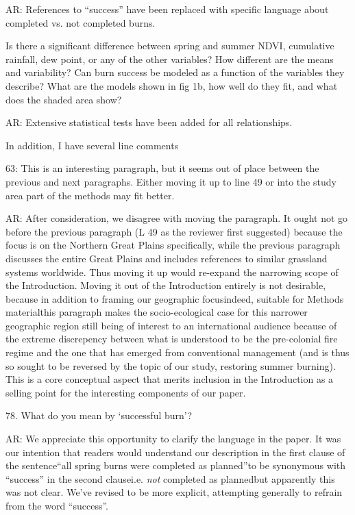 \documentclass[parskip=half, american]{scrartcl}
\newcommand{\AR}[1]
	{\color{PineGreen}AR: #1\color{black} \par }
\begin{document}
\AR{References to ``success'' have been replaced with specific language about completed vs. not completed burns. }

Is there a significant difference between spring and summer NDVI, cumulative rainfall, dew point, or any of the other variables? How different are the means and variability?  Can burn success be modeled as a function of the variables they describe?  What are the models shown in fig 1b, how well do they fit, and what does the shaded area show?

\AR{Extensive statistical tests have been added for all relationships. }

In addition, I have several line comments

63:  This is an interesting paragraph, but it seems out of place between the previous and next paragraphs.  Either moving it up to line 49 or into the study area part of the methods may fit better.

\AR{After consideration, we disagree with moving the paragraph. 
 	It ought not go before the previous paragraph (L 49 as the reviewer first suggested) because the focus is on the Northern Great Plains specifically, while the previous paragraph discusses the entire Great Plains and includes references to similar grassland systems worldwide. 
Thus moving it up would re-expand the narrowing scope of the Introduction. 
Moving it out of the Introduction entirely is not desirable, because in addition to framing our geographic focus\textemdash indeed, suitable for Methods material\textemdash this paragraph makes the socio-ecological case for this narrower geographic region still being of interest to an international audience because of the extreme discrepency between what is understood to be the pre-colonial fire regime and the one that has emerged from conventional management (and is thus so sought to be reversed by the topic of our study, restoring summer burning). 
This is a core conceptual aspect that merits inclusion in the Introduction as a selling point for the interesting components of our paper.  }

78.  What do you mean by `successful burn'?  

\AR{We appreciate this opportunity to clarify the language in the paper. 
It was our intention that readers would understand our description in the first clause of the sentence\textemdash ``all spring burns were completed as planned''\textemdash to be synonymous with ``success'' in the second clause\textemdash i.e. \emph{not} completed as planned\textemdash but apparently this was not clear. 
We've revised to be more explicit, attempting generally to refrain from the word ``success''.   }
\end{document}
